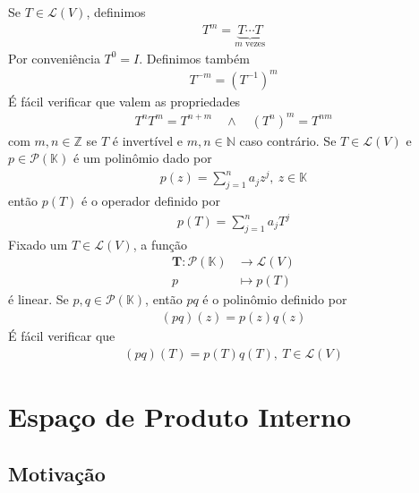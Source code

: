 \documentclass{article}
\newcommand{\K}{\mathbb{K}}
\begin{document}
Se $T \in \mathcal{L}(V)$, definimos
\begin{align*}
    T^m = \underbrace{T \cdots T}_{m \text{ vezes}}
\end{align*}
Por conveniência $T^0 = I$. Definimos também
\begin{align*}
    T^{-m} = (T^{-1})^m
\end{align*}
É fácil verificar que valem as propriedades
\begin{align*}
    T^nT^m = T^{n+m} \quad \land \quad (T^n)^m = T^{nm}
\end{align*}
com $m, n \in \mathbb{Z}$ se $T$ é invertível e $m, n \in \mathbb{N}$ caso contrário. Se $T \in \mathcal{L}(V)$ e $p \in \mathcal{P}(\K)$ é um polinômio dado por
\begin{align*}
    p(z) = \sum_{j=1}^n a_jz^j,\: z \in \K
\end{align*}
então $p(T)$ é o operador definido por
\begin{align*}
    p(T) = \sum_{j=1}^n a_jT^j
\end{align*}
Fixado um $T \in \mathcal{L}(V)$, a função
\begin{align*}
    \textbf{T}: \mathcal{P}(\K) &\to \mathcal{L}(V) \\
    p &\mapsto p(T)
\end{align*}
é linear. Se $p, q \in \mathcal{P}(\K)$, então $pq$ é o polinômio definido por
\begin{align*}
    (pq)(z) = p(z)q(z)
\end{align*}
É fácil verificar que
\begin{align*}
    (pq)(T) = p(T)q(T),\: T \in \mathcal{L}(V)
\end{align*}



\newpage

\section{Espaço de Produto Interno}

\subsection{Motivação}
\end{document}
